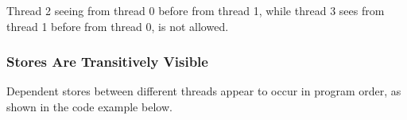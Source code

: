 \begin{table}[!hbt]
\noindent{}
\caption{Stores Are Seen in a Consistent Order by Other Threads \cite[Example 6]{ref:AMD}}
\label{tbl:litmus:amd:6}
\end{table}

\noindent
Thread 2 seeing  from thread 0 before  from thread 1, while thread 3 sees  from thread 1 before  from thread 0, is not allowed.

\subsubsection*{Stores Are Transitively Visible}

Dependent stores between different threads appear to occur in program order, as shown in the code example below.

